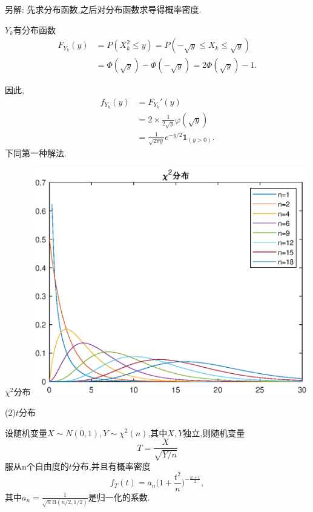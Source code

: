 	\begin{frame}	
		另解: 先求分布函数,之后对分布函数求导得概率密度.
		
		$Y_k$有分布函数
		\begin{equation}
		\begin{split}
			F_{Y_k}(y) &= P(X_k^2\leqslant y)  = P(-\sqrt{y}\leqslant X_k\leqslant \sqrt{y}) \\
			&= \varPhi(\sqrt{y}) - \varPhi(-\sqrt{y}) = 2\varPhi(\sqrt{y}) - 1.
		\end{split}
		\end{equation}
		
		因此,
		\begin{equation}
		\begin{split}
			f_{Y_k}(y) &= F_{Y_k}'(y) \\
			&= 2\times\frac{1}{2\sqrt{y}}\varphi(\sqrt{y}) \\
			&= \frac{1}{\sqrt{2\pi y}}e^{-y/2}\bm{1}_{(y>0)}.
		\end{split}
		\end{equation}
		下同第一种解法.
	\end{frame}


	\begin{frame}{$\chi^2$分布}
		\centering
		\includegraphics[width = 0.9\textwidth]{images/chi2.eps}
	\end{frame}

	\begin{frame}
		(2)$t$分布
		
		设随机变量$X\sim N(0,1),Y\sim \chi^2(n)$,其中$X,Y$独立,则\alert{随机变量
		\begin{equation}
			T = \frac{X}{\sqrt{Y/n}}
		\end{equation}
		服从n个自由度的$t$分布},并且有概率密度
		\begin{equation}
			f_T(t) = a_n \bigg(1+\frac{t^2}{n}\bigg)^{-\frac{n+1}{2}},
		\end{equation}
		其中$a_n = \frac{1}{\sqrt{n}\mathrm{B}(n/2,1/2)}$是归一化的系数.
	\end{frame}
	

